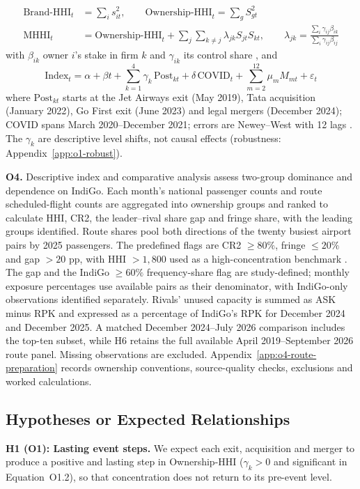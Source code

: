 \documentclass[12pt,a4paper]{article}
\newif\ifoneon
\newcommand{\oneHL}{\par\oneontrue\color{orange}\captionsetup{font+={color=blue}}}
\begin{document}
{\begin{align}
\text{Brand-HHI}_t &= \sum_i s_{it}^2, \qquad \text{Ownership-HHI}_t = \sum_g S_{gt}^2 \tag{O1.1a}\\
\text{MHHI}_t &= \text{Ownership-HHI}_t+\sum_{j}\sum_{k\neq j}\lambda_{jk}S_{jt}S_{kt},\qquad
\lambda_{jk}=\frac{\sum_i \gamma_{ij}\beta_{ik}}{\sum_i \gamma_{ij}\beta_{ij}} \tag{O1.1b}
\end{align}
with $\beta_{ik}$ owner $i$'s stake in firm $k$ and $\gamma_{ik}$ its control share \parencite{obriensalop2000}, and
\begin{equation}
\text{Index}_t = \alpha + \beta t + \sum_{k=1}^{4}\gamma_k\,\text{Post}_{kt} + \delta\,\text{COVID}_t + \sum_{m=2}^{12}\mu_m M_{mt} + \varepsilon_t \tag{O1.2}
\end{equation}
where $\text{Post}_{kt}$ starts at the Jet Airways exit (May 2019), Tata acquisition (January 2022), Go First exit (June 2023) and legal mergers (December 2024); COVID spans March 2020--December 2021; errors are Newey--West with 12 lags \parencite{neweywest1987}. The $\gamma_k$ are descriptive level shifts, not causal effects (robustness: Appendix~\ref{app:o1-robust}).
\par}

\textbf{O4.} Descriptive index and comparative analysis assess two-group dominance and dependence on IndiGo. Each month's national passenger counts and route scheduled-flight counts are aggregated into ownership groups and ranked to calculate HHI, CR2, the leader--rival share gap and fringe share, with the leading groups identified. Route shares pool both directions of the twenty busiest airport pairs by 2025 passengers. The predefined flags are CR2 $\geq80\%$, fringe $\leq20\%$ and gap $>20$ pp, with HHI $>1{,}800$ used as a high-concentration benchmark \parencite[Section~2.1]{dojftc2023merger}. The gap and the IndiGo $\geq60\%$ frequency-share flag are study-defined; monthly exposure percentages use available pairs as their denominator, with IndiGo-only observations identified separately. Rivals' unused capacity is summed as ASK minus RPK and expressed as a percentage of IndiGo's RPK for December 2024 and December 2025. A matched December 2024--July 2026 comparison includes the top-ten subset, while H6 retains the full available April 2019--September 2026 route panel. Missing observations are excluded. Appendix~\ref{app:o4-route-preparation} records ownership conventions, source-quality checks, exclusions and worked calculations.

\subsection{Hypotheses or Expected Relationships}
{\oneHL \textbf{H1 (O1): Lasting event steps.} We expect each exit, acquisition and merger to produce a positive and lasting step in Ownership-HHI ($\gamma_k>0$ and significant in Equation~O1.2), so that concentration does not return to its pre-event level.\par}
\end{document}
